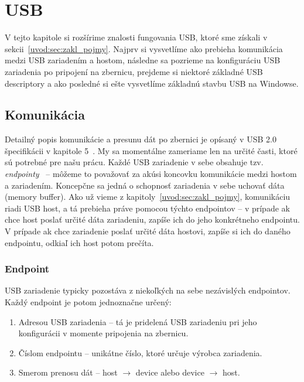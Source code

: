 \chapter{USB}
V tejto kapitole si rozšírime znalosti fungovania USB, ktoré sme získali v sekcii~\ref{uvod:sec:zakl_pojmy}. Najprv si vysvetlíme ako prebieha komunikácia medzi USB zariadením a hostom, následne sa pozrieme na konfiguráciu USB zariadenia po pripojení na zbernicu, prejdeme si niektoré základné USB descriptory a ako posledné si ešte vysvetlíme základnú stavbu USB na Windowse.

\section{Komunikácia}
Detailný popis komunikácie a presunu dát po zbernici je opísaný v USB 2.0 špecifikácii v kapitole 5~\cite{usb_chap5}. My sa momentálne zameriame len na určité časti, ktoré sú potrebné pre našu prácu. Každé USB zariadenie v sebe obsahuje tzv. \textit{endpointy}~\cite{usb_chap5_endpoint} -- môžeme to považovať za akúsi koncovku komunikácie medzi hostom a zariadením. Koncepčne sa jedná o schopnosť zariadenia v sebe uchovať dáta (memory buffer). Ako už vieme z kapitoly~\ref{uvod:sec:zakl_pojmy}, komunikáciu riadi USB host, a tá prebieha práve pomocou týchto endpointov -- v prípade ak chce host poslať určité dáta zariadeniu, zapíše ich do jeho konkrétneho endpointu. V prípade ak chce zariadenie poslať určité dáta hostovi, zapíše si ich do daného endpointu, odkiaľ ich host potom prečíta.

\subsection*{Endpoint}
\label{kap02:sec:endpoint}
USB zariadenie typicky pozostáva z niekoľkých na sebe nezávislých endpointov. Každý endpoint je potom jednoznačne určený:
\begin{enumerate}
\item Adresou USB zariadenia -- tá je pridelená USB zariadeniu pri jeho konfigurácii v momente pripojenia na zbernicu.
\item Číslom endpointu -- unikátne číslo, ktoré určuje výrobca zariadenia.
\item Smerom prenosu dát -- host $\longrightarrow$ device alebo device $\longrightarrow$ host.
\end{enumerate}

